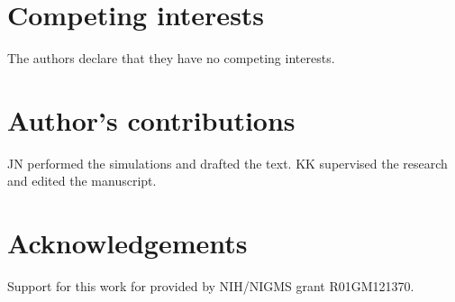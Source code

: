 \documentclass[twocolumn]{bmcart}%
\begin{document}
\begin{backmatter}

\section*{Competing interests}
  The authors declare that they have no competing interests.

\section*{Author's contributions}
JN performed the simulations and drafted the text.  KK supervised the research and edited the manuscript.

\section*{Acknowledgements}
Support for this work for provided by NIH/NIGMS grant R01GM121370.
  
  





\end{backmatter}
\end{document}
